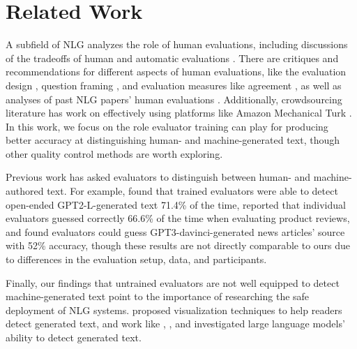 \section{Related Work}
A subfield of NLG analyzes the role of human evaluations, including discussions of the tradeoffs of human and automatic evaluations \citep{belz-reiter-2006-comparing, hashimoto-etal-2019-unifying}.
There are critiques and recommendations for different aspects of human evaluations, like the evaluation design \citep{novikova-etal-2018-rankme, santhanam-shaikh-2019-towards}, question framing \citep{schoch-etal-2020-problem}, and evaluation measures like agreement \citep{amidei-etal-2018-rethinking}, as well as analyses of past NLG papers' human evaluations \citep{vanderlee_journal, howcroft-etal-2020-twenty}.
Additionally, crowdsourcing literature has work on effectively using platforms like Amazon Mechanical Turk \citep[e.g.,][]{florian_crowdsourcing,oppenheimer_crowdsourcing,weld_crowdsourcing,mitra_crowdsourcing}.
In this work, we focus on the role evaluator training can play for producing better accuracy at distinguishing human- and machine-generated text, though other quality control methods are worth exploring.

Previous work has asked evaluators to distinguish between human- and machine-authored text. For example, \citet{ippolito-etal-2020-automatic} found that trained evaluators were able to detect open-ended GPT2-L-generated text 71.4\% of the time, \citet{garbacea-etal-2019-judge} reported that individual evaluators guessed correctly 66.6\% of the time when evaluating product reviews, and \citet{gpt3} found evaluators could guess GPT3-davinci-generated news articles' source with 52\% accuracy, though these results are not directly comparable to ours due to differences in the evaluation setup, data, and participants.

Finally, our findings that untrained evaluators are not well equipped to detect machine-generated text point to the importance of researching the safe deployment of NLG systems. \citet{gehrmann-etal-2019-gltr} proposed visualization techniques to help readers detect generated text, and work like \citet{grover_zellers}, \citet{ippolito-etal-2020-automatic}, and \citet{uchendu-etal-2020-authorship} investigated large language models' ability to detect generated text.